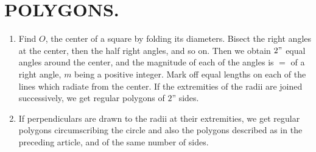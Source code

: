
\chapter{POLYGONS.}


\begin{enumerate}

\item Find $O$, the center of a square by folding its diameters.  Bisect the right
      angles at the center, then the half right angles, and so on.  Then we
      obtain $2"$ equal angles around the center, and the magnitude of each of the 
      angles is $=$ of a right angle, $m$ being a positive integer.  Mark off equal 
      lengths on each of the lines which radiate from the center.  If the 
      extremities of the radii are joined successively, we get regular polygons 
      of $2”$ sides.


%
%
%
%
%
%
%
%
%
%
%
%
%
%
%
%
%
%
%
%
%
%
%
%
%
%
%
%
%
%
%
%
\item If perpendiculars are drawn to the radii at their extremities, we get
    regular polygons circumscribing the circle and also the polygons described
    as in the preceding article, and of the same number of sides.


\end{enumerate}
